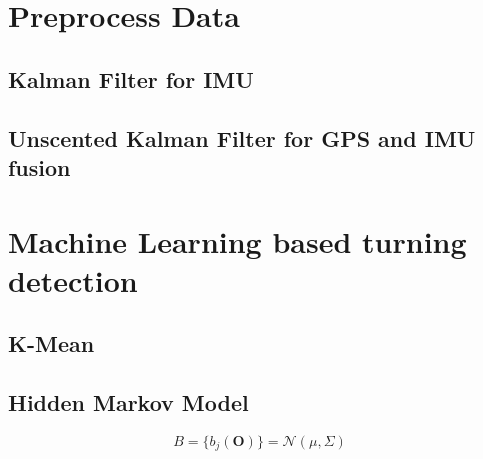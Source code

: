\documentclass{article}
\begin{document}
\section{Preprocess Data}
\subsection{Kalman Filter for IMU}
\subsection{Unscented Kalman Filter for GPS and IMU fusion}

\section{Machine Learning based turning detection}
\subsection{K-Mean}
\subsection{Hidden Markov Model}

\begin{equation}
B = \{ b_j(\textbf{O})\} = \mathcal{N} (\mu, \Sigma)
\end{equation}
\end{document}
